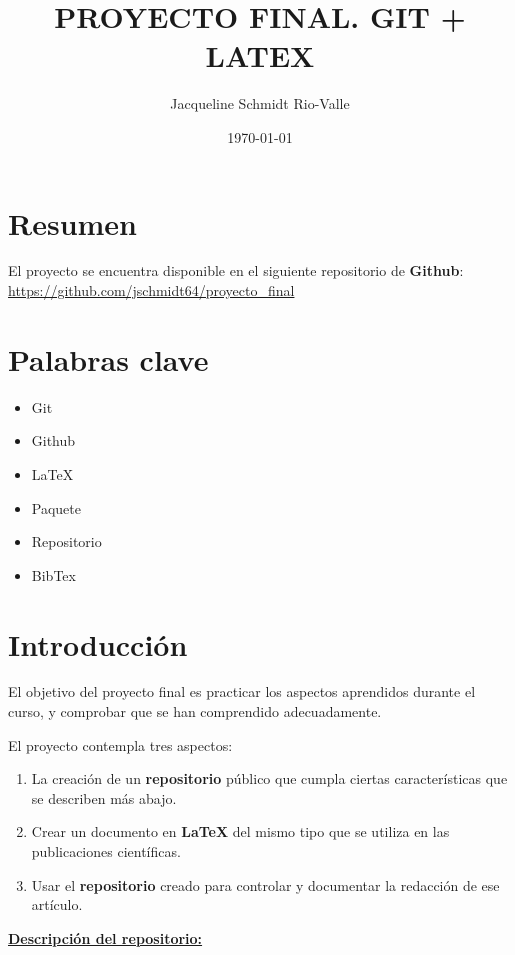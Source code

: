 \documentclass[a4paper,11pt]{article}
\title{\Huge{\textbf{PROYECTO FINAL. GIT + LATEX}}}
\author{\LARGE{Jacqueline Schmidt Rio-Valle}}
\date{\today}
\begin{document}
\maketitle	
	
\newpage	
	
\tableofcontents	

\newpage
	
\section{Resumen}

El proyecto se encuentra disponible en el siguiente repositorio de \textbf{Github}: \url{https://github.com/jschmidt64/proyecto_final}

\section{Palabras clave}

\begin{itemize}
	\item Git
	\item Github
	\item LaTeX
	\item Paquete
	\item Repositorio
	\item BibTex
\end{itemize}

\section{Introducción}

El objetivo del proyecto final es practicar los aspectos aprendidos durante el curso, y comprobar que se han comprendido adecuadamente.

El proyecto contempla tres aspectos:

\begin{enumerate}
	\item La creación de un \textbf{repositorio} público que cumpla ciertas características que se describen más abajo.
	\item Crear un documento en \textbf{LaTeX} del mismo tipo que se utiliza en las publicaciones científicas.
	\item Usar el \textbf{repositorio} creado para controlar y documentar la redacción de ese artículo.
\end{enumerate}

\textbf{\underline{Descripción del repositorio:}}
\end{document}

